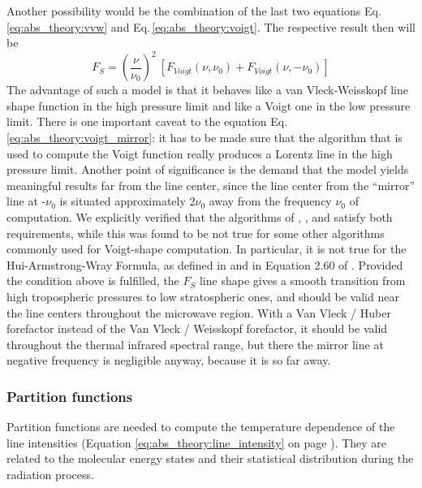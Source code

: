Another possibility would be the combination of the last two equations
Eq.\,\ref{eq:abs_theory:vvw} and Eq.\,\ref{eq:abs_theory:voigt}. The respective result then will be 
\begin{equation}\label{eq:abs_theory:voigt_mirror}
 F_S=\left(\frac{\nu}{\nu_0}\right)^2~[F_{Voigt}(\nu,\nu_0)+F_{Voigt}(\nu,-\nu_0)]
\end{equation}
The advantage of such a model is that it behaves like a van
Vleck-Weisskopf line shape function in the high pressure limit and
like a Voigt one in the low pressure limit. There is one important
caveat to the equation Eq.\,\ref{eq:abs_theory:voigt_mirror}: it has to be made sure
that the algorithm that is used to compute the Voigt function really
produces a Lorentz line in the high pressure limit. Another point of
significance is the demand that the model yields meaningful results
far from the line center, since the line center from the ``mirror''
line at -$\nu_0$ is situated approximately 2$\nu_0$ away from the
frequency $\nu_0$ of computation. We explicitly verified that the
algorithms of \citet{Drayson:76}, \citet{Oliveiro:77}, and
\citet{kuntz:99} satisfy both requirements, while this was found to be
not true for some other algorithms commonly used for Voigt-shape
computation. In particular, it is not true for the Hui-Armstrong-Wray
Formula, as defined in \citet{hui:78} and in Equation 2.60 of
\citet{pwr:93}. Provided the condition above is fulfilled, the $F_S$
line shape gives a smooth transition from high tropospheric pressures
to low stratospheric ones, and should be valid near the line centers
throughout the microwave region. With a Van Vleck / Huber forefactor
instead of the Van Vleck / Weisskopf forefactor, it should be valid
throughout the thermal infrared spectral range, but there the mirror
line at negative frequency is negligible anyway, because it is so far
away.


\subsubsection{Partition functions}

Partition functions are needed to compute the temperature dependence
of the line intensities (Equation \ref{eq:abs_theory:line_intensity} on
page \pageref{eq:abs_theory:line_intensity}).  They are related to the
molecular energy states and their statistical distribution during the
radiation process.

